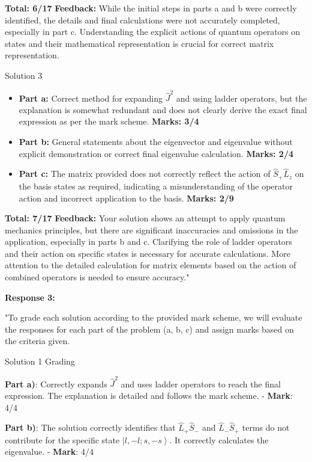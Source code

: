 \documentclass[a4paper,11pt]{article}
\begin{document}
\textbf{Total: 6/17}  
\textbf{Feedback:} While the initial steps in parts a and b were correctly identified, the details and final calculations were not accurately completed, especially in part c. Understanding the explicit actions of quantum operators on states and their mathematical representation is crucial for correct matrix representation.

Solution 3

\begin{itemize}
    \item \textbf{Part a:} Correct method for expanding \( \hat{J}^2 \) and using ladder operators, but the explanation is somewhat redundant and does not clearly derive the exact final expression as per the mark scheme. \textbf{Marks: 3/4}
    \item \textbf{Part b:} General statements about the eigenvector and eigenvalue without explicit demonstration or correct final eigenvalue calculation. \textbf{Marks: 2/4}
    \item \textbf{Part c:} The matrix provided does not correctly reflect the action of \( \hat{S}_+ \hat{L}_z \) on the basis states as required, indicating a misunderstanding of the operator action and incorrect application to the basis. \textbf{Marks: 2/9}
\end{itemize}

\textbf{Total: 7/17}  
\textbf{Feedback:} Your solution shows an attempt to apply quantum mechanics principles, but there are significant inaccuracies and omissions in the application, especially in parts b and c. Clarifying the role of ladder operators and their action on specific states is necessary for accurate calculations. More attention to the detailed calculation for matrix elements based on the action of combined operators is needed to ensure accuracy."

\textbf{Response 3:}

"To grade each solution according to the provided mark scheme, we will evaluate the responses for each part of the problem (a, b, c) and assign marks based on the criteria given. 

Solution 1 Grading

\textbf{Part a)}: Correctly expands \( \hat{J}^2 \) and uses ladder operators to reach the final expression. The explanation is detailed and follows the mark scheme. 
- \textbf{Mark}: 4/4

\textbf{Part b)}: The solution correctly identifies that \( \hat{L}_{+}\hat{S}_{-} \) and \( \hat{L}_{-}\hat{S}_{+} \) terms do not contribute for the specific state \( \left|l, -l; s, -s \right> \). It correctly calculates the eigenvalue.
- \textbf{Mark}: 4/4
\end{document}
